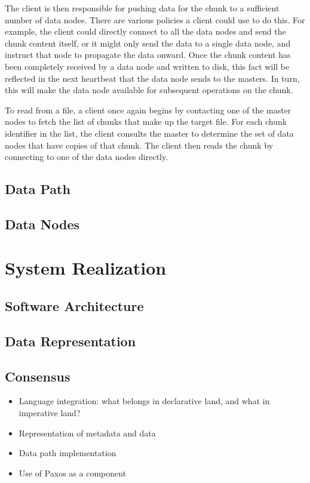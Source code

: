 \documentclass{article}
\begin{document}
The client is then responsible for pushing data for the chunk to a
sufficient number of data nodes. There are various policies a client
could use to do this. For example, the client could directly connect
to all the data nodes and send the chunk content itself, or it might
only send the data to a single data node, and instruct that node to
propagate the data onward. Once the chunk content has been completely
received by a data node and written to disk, this fact will be
reflected in the next heartbeat that the data node sends to the
masters. In turn, this will make the data node available for
subsequent operations on the chunk.

To read from a file, a client once again begins by contacting one of
the master nodes to fetch the list of chunks that make up the target
file. For each chunk identifier in the list, the client consults the
master to determine the set of data nodes that have copies of that
chunk. The client then reads the chunk by connecting to one of the
data nodes directly.

\subsection{Data Path}

\subsection{Data Nodes}

\section{System Realization}
\label{system-realize}

\subsection{Software Architecture}

\subsection{Data Representation}

\subsection{Consensus}

\begin{itemize}
\item
  Language integration: what belongs in declarative land, and what in
  imperative land?

\item
  Representation of metadata and data

\item
  Data path implementation

\item
  Use of Paxos as a component
\end{itemize}
\end{document}
